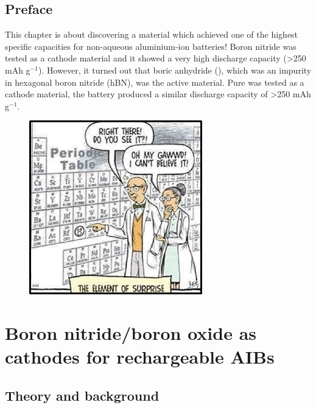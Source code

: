 \section*{Preface}
This chapter is about discovering a material which achieved one of the highest specific capacities for non-aqueous aluminium-ion batteries! Boron nitride was tested as a cathode material and it showed a very high discharge capacity (>250 mAh g$^{-1}$). However, it turned out that boric anhydride (), which was an impurity in hexagonal boron nitride (hBN), was the active material. Pure  was tested as a cathode material, the battery produced a similar discharge capacity of >250 mAh g$^{-1}$.   

\begin{figure}[tbh!]
\centering
\includegraphics[width=\textwidth]{Figures/BOhBN/ah}
\end{figure}

\newpage
\chapter{Boron nitride/boron oxide as cathodes for rechargeable AIBs} 
\label{BOhBN} 

\section{Theory and background}

